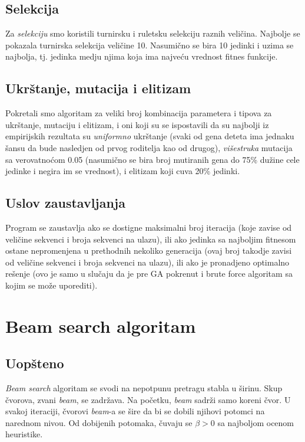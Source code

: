 \documentclass{article}
\begin{document}
    \subsection{Selekcija}
    Za \emph{selekciju} smo koristili turnirsku i ruletsku selekciju raznih veličina. Najbolje se pokazala turnirska selekcija veličine 10. Nasumično se bira 10 jedinki i uzima se najbolja, tj. jedinka medju njima koja ima najveću vrednost fitnes funkcije.

    \subsection{Ukrštanje, mutacija i elitizam}
    Pokretali smo algoritam za veliki broj kombinacija parametera i tipova za ukrštanje, mutaciju i elitizam, i oni koji su se ispostavili da su najbolji iz empirijskih rezultata su \emph{uniformno} ukrštanje (svaki od gena deteta ima jednaku šansu da bude nasledjen od prvog roditelja kao od drugog), \emph{višestruka} mutacija sa verovatnoćom 0.05 (nasumično se bira broj mutiranih gena do 75\% dužine cele jedinke i negira im se vrednost), i elitizam koji cuva 20\% jedinki.

    \subsection{Uslov zaustavljanja}
    Program se zaustavlja ako se dostigne maksimalni broj iteracija (koje zavise od veličine sekvenci i broja sekvenci na ulazu), ili ako jedinka sa najboljim fitnesom ostane nepromenjena u prethodnih nekoliko generacija (ovaj broj takodje zavisi od veličine sekvenci i broja sekvenci na ulazu), ili ako je pronadjeno optimalno rešenje (ovo je samo u slučaju da je pre GA pokrenut i brute force algoritam sa kojim se može uporediti).


    \section{Beam search algoritam}

    \subsection{Uopšteno}
    \emph{Beam search} algoritam se svodi na nepotpunu pretragu stabla u širinu. Skup čvorova, zvani \emph{beam}, se zadržava. Na početku, \emph{beam} sadrži samo koreni čvor. U svakoj iteraciji, čvorovi \emph{beam}-a se šire da bi se dobili njihovi potomci na narednom nivou. Od dobijenih potomaka, čuvaju se $\beta > 0$ sa najboljom ocenom heuristike.
\end{document}
